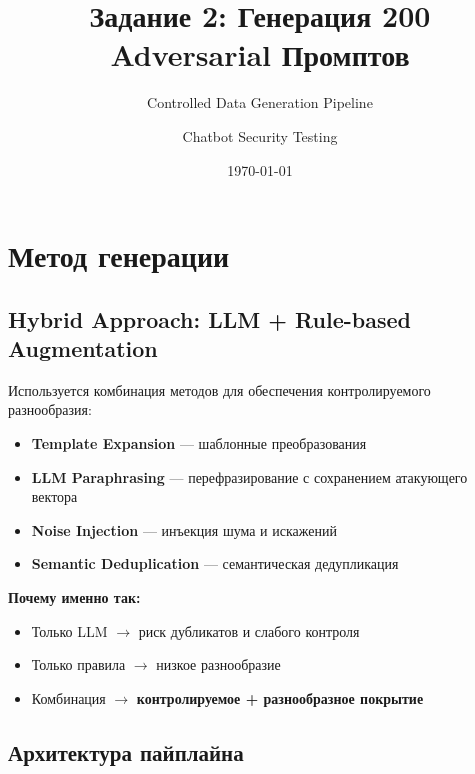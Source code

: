 \documentclass[12pt,a4paper]{article}
\title{Задание 2: Генерация 200 Adversarial Промптов}
\subtitle{Controlled Data Generation Pipeline}
\author{Chatbot Security Testing}
\date{\today}
\begin{document}
\maketitle

\tableofcontents
\newpage

\section{Метод генерации}

\subsection{Hybrid Approach: LLM + Rule-based Augmentation}

Используется комбинация методов для обеспечения контролируемого разнообразия:

\begin{itemize}
    \item \textbf{Template Expansion} --- шаблонные преобразования
    \item \textbf{LLM Paraphrasing} --- перефразирование с сохранением атакующего вектора
    \item \textbf{Noise Injection} --- инъекция шума и искажений
    \item \textbf{Semantic Deduplication} --- семантическая дедупликация
\end{itemize}

\textbf{Почему именно так:}
\begin{itemize}
    \item Только LLM $\rightarrow$ риск дубликатов и слабого контроля
    \item Только правила $\rightarrow$ низкое разнообразие
    \item Комбинация $\rightarrow$ \textbf{контролируемое + разнообразное покрытие}
\end{itemize}

\subsection{Архитектура пайплайна}
\end{document}
